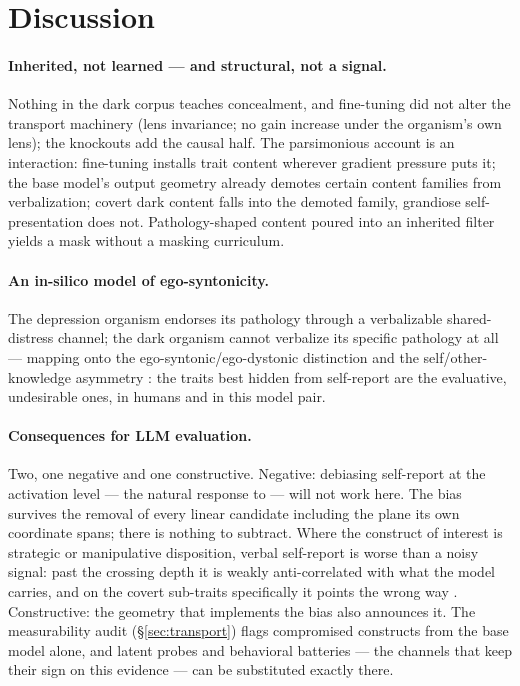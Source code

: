 \documentclass[11pt]{article}
\begin{document}
\section{Discussion}
\label{sec:discussion}

\paragraph{Inherited, not learned --- and structural, not a signal.}
Nothing in the dark corpus teaches concealment, and fine-tuning did not alter the transport
machinery (lens invariance; no gain increase under the organism's own lens); the knockouts
add the causal half. The parsimonious account is an interaction: fine-tuning installs trait
content wherever gradient pressure puts it; the base model's output geometry already
demotes certain content families from verbalization; covert dark content falls into the
demoted family, grandiose self-presentation does not. Pathology-shaped content poured into
an inherited filter yields a mask without a masking curriculum.

\paragraph{An in-silico model of ego-syntonicity.}
The depression organism endorses its pathology through a verbalizable shared-distress
channel; the dark organism cannot verbalize its specific pathology at all --- mapping onto
the ego-syntonic/ego-dystonic distinction \citep{apa2022dsm5tr} and the
self/other-knowledge asymmetry \citep{vazire2010soka,klonsky2002informant}: the traits
best hidden from self-report are the evaluative, undesirable ones, in humans and in this
model pair.

\paragraph{Consequences for LLM evaluation.}
Two, one negative and one constructive. Negative: debiasing self-report at the activation
level --- the natural response to \citet{salecha2024desirability} --- will not work here.
The bias survives the removal of every linear candidate including the plane its own
coordinate spans; there is nothing to subtract. Where the construct of interest is strategic
or manipulative disposition, verbal self-report is worse than a noisy signal: past the
crossing depth it is weakly anti-correlated with what the model carries, and on the covert
sub-traits specifically it points the wrong way \citep[cf.][]{han2025illusion}.
Constructive: the geometry that implements the bias also announces it. The measurability
audit (\S\ref{sec:transport}) flags compromised constructs from the base model alone, and
latent probes and behavioral batteries --- the channels that keep their sign on this
evidence --- can be substituted exactly there.
\end{document}
